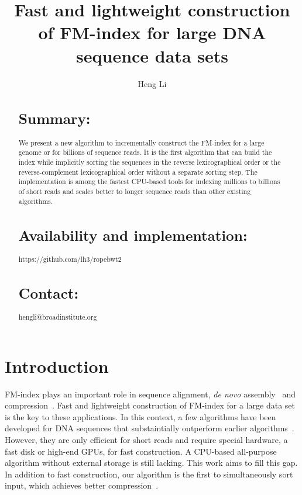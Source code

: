 \documentclass{bioinfo}
\begin{document}

\title[Constructing BWT]{Fast and lightweight construction of FM-index for large DNA sequence data sets}

\author[Li]{Heng Li}

\address{Broad Institute, 7 Cambridge Center, Cambridge, MA 02142, USA}

\maketitle

\begin{abstract}
\section{Summary:} We present a new algorithm to incrementally construct the
FM-index for a large genome or for billions of sequence reads. It is the first
algorithm that can build the index while implicitly sorting the sequences in
the reverse lexicographical order or the reverse-complement
lexicographical order without a separate sorting step. The
implementation is among the fastest CPU-based tools for indexing millions to
billions of short reads and scales better to longer sequence reads than other
existing algorithms.

\section{Availability and implementation:} https://github.com/lh3/ropebwt2

\section{Contact:} hengli@broadinstitute.org
\end{abstract}

\section{Introduction}

FM-index plays an important role in sequence alignment, {\it de novo}
assembly~\citep{Simpson:2012aa} and compression~\citep{Cox:2012ly}. Fast
and lightweight construction of FM-index for a large data set is the key to
these applications. In this context, a few algorithms have been developed for
DNA sequences that substaintially outperform earlier
algorithms~\citep{DBLP:journals/tcs/BauerCR13,DBLP:journals/corr/LiuLL14}.
However, they are only efficient for short reads and require special hardware,
a fast disk or high-end GPUs, for fast construction. A CPU-based all-purpose
algorithm without external storage is still lacking. This work aims to fill
this gap. In addition to fast construction, our algorithm is the first to
simultaneously sort input, which achieves better compression~\citep{Cox:2012ly}.
\end{document}
